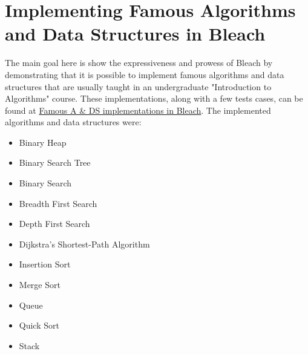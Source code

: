 \section{Implementing Famous Algorithms and Data Structures in Bleach}
The main goal here is show the expressiveness and prowess of Bleach by demonstrating that it is possible to implement famous algorithms and data structures that are usually taught in an undergraduate "Introduction to Algorithms" course. These implementations, along with a few tests cases, can be found at \href{https://github.com/vmmc2/Bleach/tree/main/tests/algorithms_and_data_structures}{Famous A \& DS implementations in Bleach}. The implemented algorithms and data structures were:
\begin{itemize}
    \item Binary Heap
    \item Binary Search Tree
    \item Binary Search
    \item Breadth First Search
    \item Depth First Search
    \item Dijkstra's Shortest-Path Algorithm
    \item Insertion Sort
    \item Merge Sort
    \item Queue
    \item Quick Sort
    \item Stack
\end{itemize}

